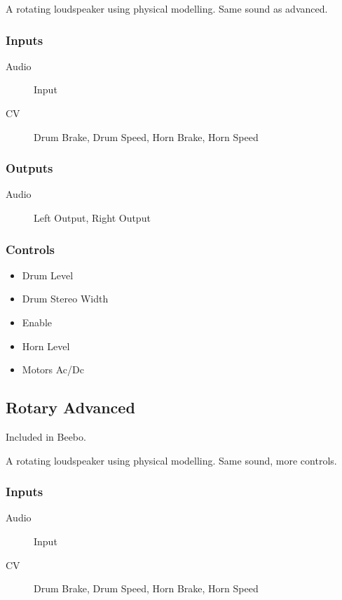 A rotating loudspeaker using physical modelling. Same sound as advanced.



\subsubsection{Inputs}
\begin{description}
\item [Audio] Input
\item [CV] Drum Brake, Drum Speed, Horn Brake, Horn Speed
\end{description}

\subsubsection{Outputs}
\begin{description}
\item [Audio] Left Output, Right Output
\end{description}

\subsubsection{Controls}
\begin{itemize}
\item Drum Level
\item Drum Stereo Width
\item Enable
\item Horn Level
\item Motors Ac/Dc
\end{itemize}

\subsection{Rotary Advanced}

Included in Beebo.

A rotating loudspeaker using physical modelling. Same sound, more controls.



\subsubsection{Inputs}
\begin{description}
\item [Audio] Input
\item [CV] Drum Brake, Drum Speed, Horn Brake, Horn Speed
\end{description}

